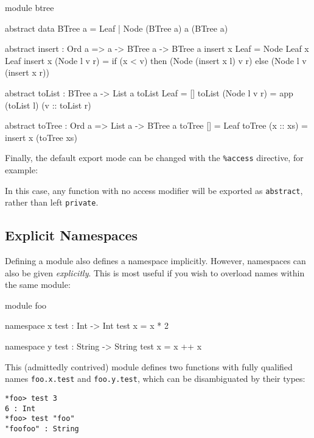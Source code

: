 \begin{code}[caption={Binary Tree module, with export modifiers}, label=bstmodp]
module btree

abstract data BTree a = Leaf
                      | Node (BTree a) a (BTree a)

abstract
insert : Ord a => a -> BTree a -> BTree a
insert x Leaf = Node Leaf x Leaf
insert x (Node l v r) = if (x < v) then (Node (insert x l) v r)
                                   else (Node l v (insert x r))

abstract
toList : BTree a -> List a
toList Leaf = []
toList (Node l v r) = app (toList l) (v :: toList r)

abstract
toTree : Ord a => List a -> BTree a
toTree [] = Leaf
toTree (x :: xs) = insert x (toTree xs)
\end{code}

\noindent
Finally, the default export mode can be changed with the \texttt{\%access} directive,
for example:

\begin{code}
\end{code}

\noindent
In this case, any function with no access modifier will be exported as \texttt{abstract},
rather than left \texttt{private}.

\subsection{Explicit Namespaces}

Defining a module also defines a namespace implicitly. However, namespaces can also
be given \emph{explicitly}. This is most useful if you wish to overload names within
the same module:

\begin{code}
module foo

namespace x
  test : Int -> Int
  test x = x * 2

namespace y
  test : String -> String
  test x = x ++ x 
\end{code}

\noindent
This (admittedly contrived) module defines two functions with fully qualified names
\texttt{foo.x.test} and \texttt{foo.y.test}, which can be disambiguated by their
types:

\begin{lstlisting}
*foo> test 3 
6 : Int
*foo> test "foo" 
"foofoo" : String
\end{lstlisting}


